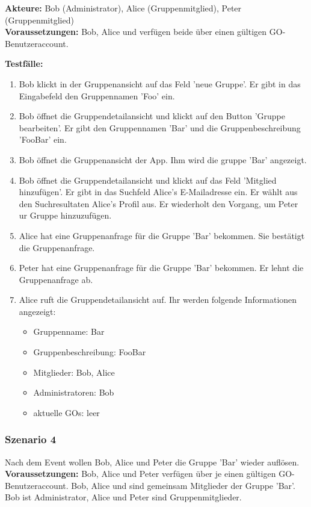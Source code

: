 \documentclass[parskip=full]{scrartcl}
\def\threedigits#1{%
  \ifnum#1<100 0\fi
  \ifnum#1<10 0\fi
  \number#1}
\begin{document}
\textbf{Akteure:} Bob (Administrator), Alice (Gruppenmitglied), Peter (Gruppenmitglied) \\

\textbf{Voraussetzungen: }Bob, Alice und verfügen beide über einen gültigen GO-Benutzeraccount.

\textbf{Testfälle:}
\begin{enumerate}[label={\textbf{/T\protect\threedigits{\theenumi}0/}}, leftmargin=*, resume]
	\item Bob klickt in der Gruppenansicht auf das Feld 'neue Gruppe'. Er gibt in das Eingabefeld den Gruppennamen 'Foo' ein.
	\item Bob öffnet die Gruppendetailansicht und klickt auf den Button 'Gruppe bearbeiten'. Er gibt den Gruppennamen 'Bar' und die Gruppenbeschreibung 'FooBar' ein.
	\item Bob öffnet die Gruppenansicht der App. Ihm wird die gruppe 'Bar' angezeigt.
	\item Bob öffnet die Gruppendetailansicht und klickt auf das Feld 'Mitglied hinzufügen'. Er gibt in das Suchfeld Alice's E-Mailadresse ein. Er wählt aus den Suchresultaten Alice's Profil aus. Er wiederholt den Vorgang, um Peter ur Gruppe hinzuzufügen.
	\item Alice hat eine Gruppenanfrage für die Gruppe 'Bar' bekommen. Sie bestätigt die Gruppenanfrage.
	\item Peter hat eine Gruppenanfrage für die Gruppe 'Bar' bekommen. Er lehnt die Gruppenanfrage ab.
	\item Alice ruft die Gruppendetailansicht auf. Ihr werden folgende Informationen angezeigt:
	\begin{itemize}
		\item Gruppenname: Bar
		\item Gruppenbeschreibung: FooBar
		\item Mitglieder: Bob, Alice
		\item Administratoren: Bob
		\item aktuelle GOs: leer
	\end{itemize}
\end{enumerate}

\subsubsection*{Szenario 4}Nach dem Event wollen Bob, Alice und Peter die Gruppe 'Bar' wieder auflösen.\\

\textbf{Voraussetzungen: }Bob, Alice und Peter verfügen über je einen gültigen GO-Benutzeraccount. Bob, Alice und sind gemeinsam Mitglieder der Gruppe 'Bar'. Bob ist Administrator, Alice und Peter sind Gruppenmitglieder.
\end{document}
